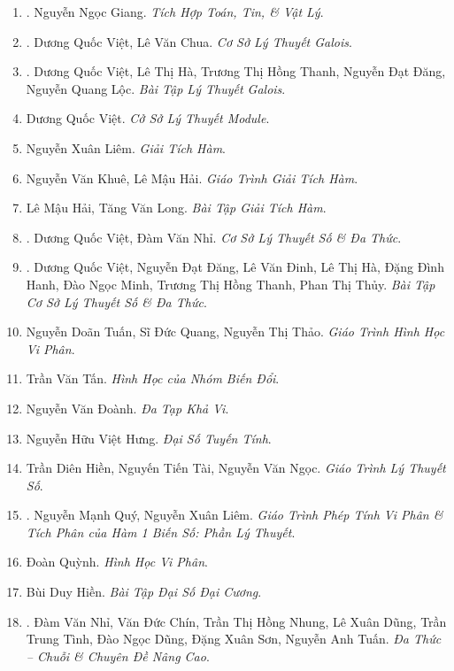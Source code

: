 \documentclass{article}
\begin{document}
\begin{enumerate}
	\item \cite{Giang2019}. Nguyễn Ngọc Giang. \textit{Tích Hợp Toán, Tin, \& Vật Lý}.\hfill{\sf[bought]}
	\item \cite{Viet_Chua2022}. Dương Quốc Việt, Lê Văn Chua. \textit{Cơ Sở Lý Thuyết Galois}.\hfill{\sf[bought]}
	\item \cite{Viet_Ha_Thanh_Dang_Loc2022}. Dương Quốc Việt, Lê Thị Hà, Trương Thị Hồng Thanh, Nguyễn Đạt Đăng, Nguyễn Quang Lộc. \textit{Bài Tập Lý Thuyết Galois}.\hfill{\sf[bought]}
	\item Dương Quốc Việt. \textit{Cở Sở Lý Thuyết Module}.
	\item Nguyễn Xuân Liêm. \textit{Giải Tích Hàm}.
	\item Nguyễn Văn Khuê, Lê Mậu Hải. \textit{Giáo Trình Giải Tích Hàm}.
	\item Lê Mậu Hải, Tăng Văn Long. \textit{Bài Tập Giải Tích Hàm}.
	\item \cite{Viet_Nhi2022}. Dương Quốc Việt, Đàm Văn Nhỉ. \textit{Cơ Sở Lý Thuyết Số \& Đa Thức}.\hfill{\sf[bought]}
	\item \cite{Viet_Dang_Dinh_Ha_Hanh_Minh_Thanh_Thuy2022}. Dương Quốc Việt, Nguyễn Đạt Đăng, Lê Văn Đinh, Lê Thị Hà, Đặng Đình Hanh, Đào Ngọc Minh, Trương Thị Hồng Thanh, Phan Thị Thủy. \textit{Bài Tập Cơ Sở Lý Thuyết Số \& Đa Thức}.\hfill{\sf[bought]}
	\item Nguyễn Doãn Tuấn, Sĩ Đức Quang, Nguyễn Thị Thảo. \textit{Giáo Trình Hình Học Vi Phân}.
	\item Trần Văn Tấn. \textit{Hình Học của Nhóm Biến Đổi}.
	\item Nguyễn Văn Đoành. \textit{Đa Tạp Khả Vi}.
	\item Nguyễn Hữu Việt Hưng. \textit{Đại Số Tuyến Tính}.
	\item Trần Diên Hiền, Nguyến Tiến Tài, Nguyễn Văn Ngọc. \textit{Giáo Trình Lý Thuyết Số}.
	\item \cite{Quy_Liem2012}. Nguyễn Mạnh Quý, Nguyễn Xuân Liêm. \textit{Giáo Trình Phép Tính Vi Phân \& Tích Phân của Hàm 1 Biến Số: Phần Lý Thuyết}.\hfill{\sf[bought]}
	\item Đoàn Quỳnh. \textit{Hình Học Vi Phân}.
	\item Bùi Duy Hiền. \textit{Bài Tập Đại Số Đại Cương}.
	\item \cite{Nhi_Chin_Dung_Dung_Tinh_Dung_Son_Tuan2017}. Đàm Văn Nhỉ, Văn Đức Chín, Trần Thị Hồng Nhung, Lê Xuân Dũng, Trần Trung Tình, Đào Ngọc Dũng, Đặng Xuân Sơn, Nguyễn Anh Tuấn. \textit{Đa Thức -- Chuỗi \& Chuyên Đề Nâng Cao}.

\end{enumerate}
\end{document}
